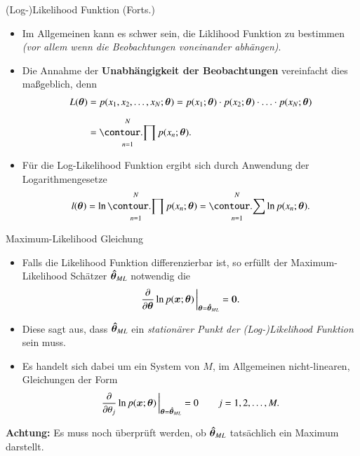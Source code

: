 \begin{frame}{(Log-)Likelihood Funktion (Forts.)}{}
	\begin{itemize}
		\item Im Allgemeinen kann es schwer sein, die Liklihood Funktion zu bestimmen
			\textit{(vor allem wenn die Beobachtungen voneinander abhängen)}.
		\item Die Annahme der \textbf{Unabhängigkeit der Beobachtungen} vereinfacht dies maßgeblich, denn
		\begin{align*}
			L(\btheta)
				&= p(x_1, x_2, \ldots, x_N; \btheta)
					= p(x_1; \btheta) \cdot p(x_2; \btheta) \cdot \ldots \cdot p(x_N; \btheta)
			\\[2mm]
				&= \prod_{n=1}^N p(x_n; \btheta).
		\end{align*}
		\item Für die Log-Likelihood Funktion ergibt sich durch Anwendung der Logarithmengesetze
		$$l(\btheta) = \ln \prod_{n=1}^N p(x_n; \btheta) = \sum_{n=1}^N \ln p(x_n; \btheta).$$
	\end{itemize}
\end{frame}


\begin{frame}{Maximum-Likelihood Gleichung}{}
	\begin{itemize}
		\item Falls die Likelihood Funktion differenzierbar ist, so erfüllt der Maximum-Likelihood Schätzer $\bm{\hat{\theta}}_{ML}$
			notwendig die 
		\begin{equation*}
			\frac{\partial}{\partial \bm{\theta}} \ln p(\bm{x}; \bm{\theta})\,\bigg\vert_{\bm{\theta} = \bm{\hat{\theta}}_{ML}} = \bm{0}.
		\end{equation*}
		\item Diese sagt aus, dass $\bm{\hat{\theta}}_{ML}$ ein \textit{stationärer Punkt der (Log-)Likelihood Funktion} sein muss.
		\item Es handelt sich dabei um ein System von $M$, im Allgemeinen nicht-linearen, Gleichungen der Form
		\begin{equation*}
			\frac{\partial}{\partial \theta_j} \ln p(\bm{x}; \bm{\theta})\,\bigg\vert_{\bm{\theta} = \bm{\hat{\theta}}_{ML}} = 0 \qquad j = 1, 2, \ldots, M.
		\end{equation*}
	\end{itemize}
	
	\begin{boxGray}
		\textbf{Achtung:} Es muss noch überprüft werden, ob $\bm{\hat{\theta}}_{ML}$ tatsächlich ein Maximum darstellt.
	\end{boxGray}
\end{frame}


